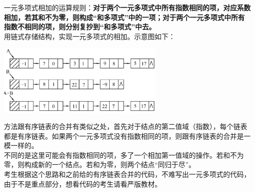 {一元多项式相加的运算规则：{\textbf{对于两个一元多项式中所有指数相同的项，对应系数相加，若其和不为零，则构成``和多项式''中的一项；对于两个一元多项式中所有指数不相同的项，则分别复抄到``和多项式''中去。}}\\
用链式存储结构，实现一元多项式的相加。示意图如下：}

\includegraphics[width=3.22917in,height=1.37500in]{png-jpeg-pics/395B62F57E36F93B9A676676A26C7BD5.png}

{方法跟有序链表的合并有类似之处，首先对于结点的第二值域（指数），每个链表都是有序链表。如果两个一元多项式没有指数相同的项，则跟有序链表的合并是一模一样的。\\
{不同的是这里可能会有指数相同的项，多了一个相加第一值域的操作。若和不为零，则构成新的一个结点。若和为零，则两个结点``同归于尽''。}\\
考生根据这个思路和之前给的有序链表合并的代码，不难写出一元多项式的代码，由于不是重点部分，想看代码的考生请看严版教材。}
